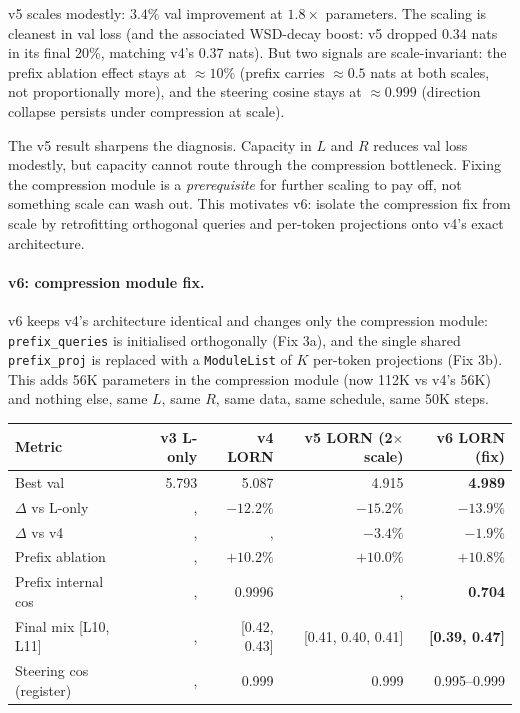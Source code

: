 \documentclass[11pt, a4paper]{article}
\theoremstyle{plain}
\theoremstyle{definition}
\theoremstyle{remark}
\begin{document}
v5 scales modestly: $3.4\%$ val improvement at $1.8\times$ parameters.
The scaling is cleanest in val loss (and the associated WSD-decay boost: v5 dropped $0.34$ nats in its final 20\%, matching v4's $0.37$ nats).
But two signals are scale-invariant: the prefix ablation effect stays at $\approx$$10\%$ (prefix carries $\approx 0.5$ nats at both scales, not proportionally more), and the steering cosine stays at $\approx 0.999$ (direction collapse persists under compression at scale).

The v5 result sharpens the diagnosis.
Capacity in $L$ and $R$ reduces val loss modestly, but capacity cannot route through the compression bottleneck.
Fixing the compression module is a \emph{prerequisite} for further scaling to pay off, not something scale can wash out.
This motivates v6: isolate the compression fix from scale by retrofitting orthogonal queries and per-token projections onto v4's exact architecture.

\paragraph{v6: compression module fix.}
v6 keeps v4's architecture identical and changes only the compression module: \texttt{prefix\_queries} is initialised orthogonally (Fix 3a), and the single shared \texttt{prefix\_proj} is replaced with a \texttt{ModuleList} of $K$ per-token projections (Fix 3b).
This adds 56K parameters in the compression module (now 112K vs v4's 56K) and nothing else, same $L$, same $R$, same data, same schedule, same 50K steps.

\begin{center}
\begin{tabular}{lrrrr}
\toprule
Metric & v3 L-only & v4 LORN & v5 LORN (2$\times$ scale) & v6 LORN (fix) \\
\midrule
Best val & 5.793 & 5.087 & 4.915 & \textbf{4.989} \\
$\Delta$ vs L-only & ,  & $-12.2\%$ & $-15.2\%$ & $-13.9\%$ \\
$\Delta$ vs v4 & ,  & ,  & $-3.4\%$ & $-1.9\%$ \\
Prefix ablation & ,  & $+10.2\%$ & $+10.0\%$ & \textbf{$+10.8\%$} \\
Prefix internal cos & ,  & 0.9996 & ,  & \textbf{0.704} \\
Final mix [L10, L11] & ,  & [0.42, 0.43] & [0.41, 0.40, 0.41] & \textbf{[0.39, 0.47]} \\
Steering cos (register) & ,  & 0.999 & 0.999 & 0.995--0.999 \\
\bottomrule
\end{tabular}
\end{center}
\end{document}
